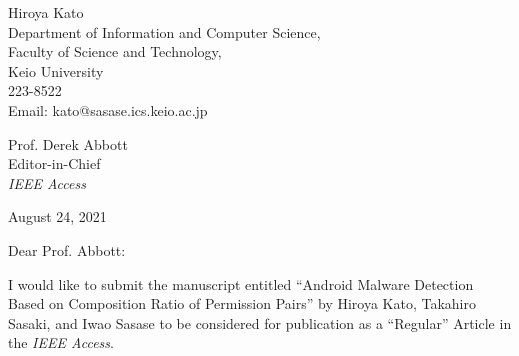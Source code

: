 \documentclass[12pt, a4paper]{article}
\title{}
\begin{document}
\maketitle %
\thispagestyle{empty} %

\begin{flushleft}
Hiroya Kato\\
Department of Information and Computer Science, \\
Faculty of Science and Technology, \\
Keio University\\
223-8522\\
Email: kato@sasase.ics.keio.ac.jp 
\end{flushleft}

\begin{flushleft}
Prof. Derek Abbott  \\
Editor-in-Chief \\
\emph{IEEE Access}
\end{flushleft}

\begin{flushleft}
August 24, 2021 
\end{flushleft}

\begin{flushleft}
Dear Prof. Abbott:  \\
\end{flushleft}

\noindent
I would like to submit the manuscript entitled ``Android Malware Detection Based on Composition Ratio of Permission Pairs'' by Hiroya Kato, Takahiro Sasaki, and Iwao Sasase to be considered for publication as a ``Regular'' Article in the \textit{IEEE Access}.  
\end{document}

